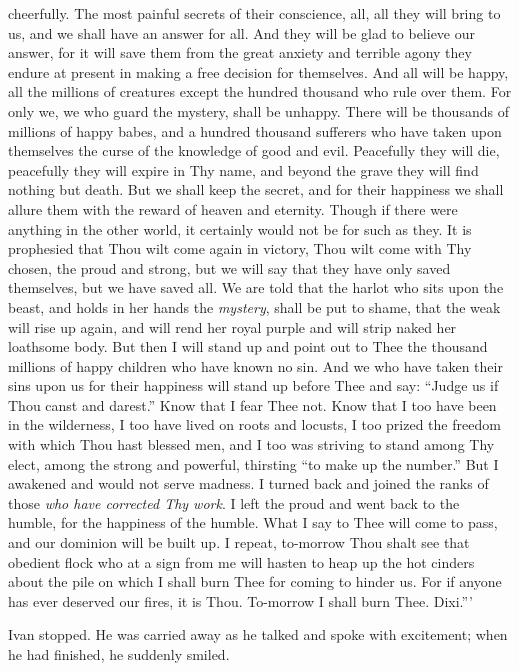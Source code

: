 cheerfully. The most painful secrets of their conscience, all, all
they will bring to us, and we shall have an answer for all. And they
will be glad to believe our answer, for it will save them from the
great anxiety and terrible agony they endure at present in making a
free decision for themselves. And all will be happy, all the
 millions of creatures except the hundred thousand who rule
over them. For only we, we who guard the mystery, shall be unhappy.
There will be thousands of millions of happy babes, and a hundred
thousand sufferers who have taken upon themselves the curse of the
knowledge of good and evil. Peacefully they will die, peacefully they
will expire in Thy name, and beyond the grave they will find nothing
but death. But we shall keep the secret, and for their happiness we
shall allure them with the reward of heaven and eternity. Though if
there were anything in the other world, it certainly would not be for
such as they. It is prophesied that Thou wilt come again in victory,
Thou wilt come with Thy chosen, the proud and strong, but we will say
that they have only saved themselves, but we have saved all. We are
told that the harlot who sits upon the beast, and holds in her hands
the \textit{mystery}, shall be put to shame, that the weak will rise
up again, and will rend her royal purple and will strip naked her
loathsome body. But then I will stand up and point out to Thee the
thousand millions of happy children who have known no sin. And we who
have taken their sins upon us for their happiness will stand up before
Thee and say: ``Judge us if Thou canst and darest.'' Know that I fear
Thee not. Know that I too have been in the wilderness, I too have
lived on roots and locusts, I too prized the freedom with which Thou
hast blessed men, and I too was striving to stand among Thy elect,
among the strong and powerful, thirsting ``to make up the number.''
But I awakened and would not serve madness. I turned back and joined
the ranks of those \textit{who have corrected Thy work}. I left the
proud and went back to the humble, for the happiness of the humble.
What I say to Thee will come to pass, and our dominion will be built
up. I repeat, to-morrow Thou shalt see that obedient flock who at a
sign from me will hasten to heap up the hot cinders about the pile on
which I shall burn Thee for coming to hinder us. For if anyone has
ever deserved our fires, it is Thou. To-morrow I shall burn Thee.
Dixi.'''

Ivan stopped. He was carried away as he talked and spoke with
excitement; when he had finished, he suddenly smiled.

